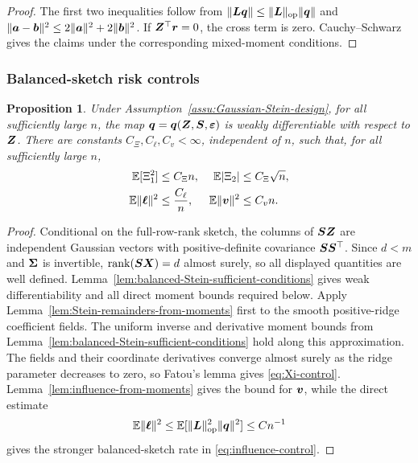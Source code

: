 \documentclass{article}
\theoremstyle{plain} %
\newtheorem{proposition}[theorem]{Proposition}
\theoremstyle{definition} %
\theoremstyle{definition} %
\begin{document}
\begin{proof}
The first two inequalities follow from
$\lVert\boldsymbol{L}\boldsymbol{q}\rVert\leq\lVert\boldsymbol{L}\rVert_{\rm op}\lVert\boldsymbol{q}\rVert$ and
$\lVert\boldsymbol{a}-\boldsymbol{b}\rVert^2\leq2\lVert\boldsymbol{a}\rVert^2+2\lVert\boldsymbol{b}\rVert^2$.
If $\boldsymbol{Z}^\top\boldsymbol{r}=0$, the cross term is zero.  Cauchy--Schwarz gives the
claims under the corresponding mixed-moment conditions.
\end{proof}

\subsubsection{Balanced-sketch risk controls}
\label{app:proof-Stein-risk-from-moments}

\begin{proposition}
\label{prop:Stein-risk-from-moments}
Under Assumption~\ref{assu:Gaussian-Stein-design}, for all sufficiently large
$n$, the map $\boldsymbol{q}=\boldsymbol{q}(\boldsymbol{Z},\boldsymbol{S},{\boldsymbol{\varepsilon} })$ is weakly differentiable with respect to $\boldsymbol{Z}$.
There are constants $C_\Xi,C_\ell,C_v<\infty$, independent of $n$, such that,
for all sufficiently large $n$,
\begin{align}
    {\mathbb{E}}[\Xi_1^2]&\leq C_\Xi n,
    &
    {\mathbb{E}}|\Xi_2|&\leq C_\Xi\sqrt n,
    \label{eq:Xi-control}\\
    {\mathbb{E}}\lVert\boldsymbol{\ell}\rVert^2&\leq \frac{C_\ell}{n},
    &
    {\mathbb{E}}\lVert\boldsymbol{v}\rVert^2&\leq C_v n.
    \label{eq:influence-control}
\end{align}
\end{proposition}

\begin{proof}
Conditional on the full-row-rank sketch, the columns of $\boldsymbol{S}\boldsymbol{Z}$ are
independent Gaussian vectors with positive-definite covariance
$\boldsymbol{S}\boldsymbol{S}^\top$.  Since $d<m$ and $\boldsymbol{\Sigma}$ is invertible,
$\operatorname{rank}(\boldsymbol{S}\boldsymbol{X})=d$ almost surely, so all displayed quantities are well defined.
Lemma~\ref{lem:balanced-Stein-sufficient-conditions} gives weak
differentiability and all direct moment bounds required below.
Apply Lemma~\ref{lem:Stein-remainders-from-moments} first to the smooth
positive-ridge coefficient fields. The uniform inverse and derivative
moment bounds from Lemma~\ref{lem:balanced-Stein-sufficient-conditions}
hold along this approximation. The fields and their coordinate derivatives
converge almost surely as the ridge parameter decreases to zero, so Fatou's
lemma gives \eqref{eq:Xi-control}. Lemma~\ref{lem:influence-from-moments}
gives the bound for $\boldsymbol{v}$, while the direct estimate
\begin{align*}
    {\mathbb{E}}\lVert\boldsymbol{\ell}\rVert^2
    \leq {\mathbb{E}}[\lVert\boldsymbol{L}\rVert_{\rm op}^2\lVert\boldsymbol{q}\rVert^2]
    \leq Cn^{-1}
\end{align*}
gives the stronger balanced-sketch rate in \eqref{eq:influence-control}.
\end{proof}
\end{document}
